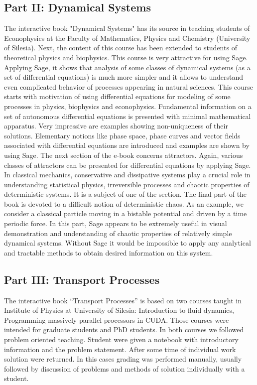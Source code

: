 \documentclass{deliverablereport}
\begin{document}
{{{\subsection{Part II: Dynamical Systems}

The interactive book "Dynamical Systems" has its source in teaching
students of Econophysics at the Faculty of Mathematics, Physics and
Chemistry (University of Silesia). Next, the content of this course
has been extended to students of theoretical physics and
biophysics. This course is very attractive for using Sage. Applying
Sage, it shows that analysis of some classes of dynamical systems (as
a set of differential equations) is much more simpler and it allows to
understand even complicated behavior of processes appearing in natural
sciences.  This course starts with motivation of using differential
equations for modeling of some processes in physics, biophysics and
econophysics. Fundamental information on a set of autonomous
differential equations is presented with minimal mathematical
apparatus. Very impressive are examples showing non-uniqueness of
their solutions. Elementary notions like phase space, phase curves and
vector fields associated with differential equations are introduced
and examples are shown by using Sage. The next section of the e-book
concerns attractors. Again, various classes of attractors can be
presented for differential equations by applying Sage. In classical
mechanics, conservative and dissipative systems play a crucial role in
understanding statistical physics, irreversible processes and chaotic
properties of deterministic systems. It is a subject of one of the
section. The final part of the book is devoted to a difficult notion
of deterministic chaos. As an example, we consider a classical
particle moving in a bistable potential and driven by a time periodic
force. In this part, Sage appears to be extremely useful in visual
demonstration and understanding of chaotic properties of relatively
simple dynamical systems. Without Sage it would be impossible to apply
any analytical and tractable methods to obtain desired information on
this system.


\subsection{Part III: Transport Processes}

The interactive book ``Transport Processes'' is based on two courses
taught in Institute of Physics at University of Silesia: Introduction
to fluid dynamics, Programming massively parallel processors in
CUDA. Those courses were intended for graduate students and PhD
students. In both courses we followed problem oriented
teaching. Student were given a \Jupyter notebook with introductory
information and the problem statement. After some time of individual
work solution were returned. In this cases grading was performed
manually, usually followed by discussion of problems and methods of
solution individually with a student.

}}}
\end{document}
